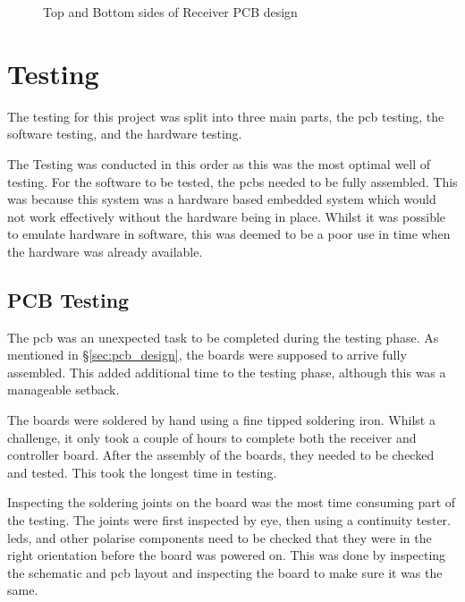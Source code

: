\documentclass [11pt]{article}
\begin{document}
\begin{figure}[H]
\centering
{}
\caption{Top and Bottom sides of Receiver PCB design}
\label{fig:finalised_PCB_design_receiver}
\end{figure} 

\section{Testing}

The testing for this project was split into three main parts, the \gls{pcb} testing, the software testing, and the hardware testing. 

The Testing was conducted in this order as this was the most optimal well of testing. For the software to be tested, the \gls{pcb}s needed to be fully assembled. This was because this system was a hardware based embedded system which would not work effectively without the hardware being in place. Whilst it was possible to emulate hardware in software, this was deemed to be a poor use in time when the hardware was already available. 

\subsection{PCB Testing}\label{sec:pcb_testing}

The \gls{pcb} was an unexpected task to be completed during the testing phase. As mentioned in §\ref{sec:pcb_design}, the boards were supposed to arrive fully assembled. This added additional time to the testing phase, although this was a manageable setback. 

The boards were soldered by hand using a fine tipped soldering iron. Whilst a challenge, it only took a couple of hours to complete both the receiver and controller board. After the assembly of the boards, they needed to be checked and tested. This took the longest time in testing. 

Inspecting the soldering joints on the board was the most time consuming part of the testing. The joints were first inspected by eye, then using a continuity tester. \gls{led}s, and other polarise components need to be checked that they were in the right orientation before the board was powered on. This was done by inspecting the schematic and \gls{pcb} layout and inspecting the board to make sure it was the same.   
\end{document}
